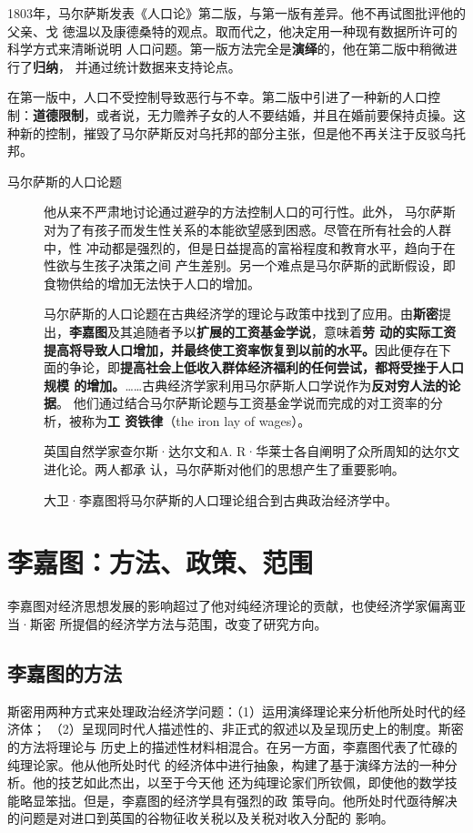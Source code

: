 1803年，马尔萨斯发表《人口论》第二版，与第一版有差异。他不再试图批评他的父亲、戈
徳温以及康德桑特的观点。取而代之，他决定用一种现有数据所许可的科学方式来清晰说明
人口问题。第一版方法完全是\textbf{演绎}的，他在第二版中稍微进行了\textbf{归纳}，
并通过统计数据来支持论点。

在第一版中，人口不受控制导致恶行与不幸。第二版中引进了一种新的人口控
制：\textbf{道德限制}，或者说，无力赡养子女的人不要结婚，并且在婚前要保持贞操。这
种新的控制，摧毁了马尔萨斯反对乌托邦的部分主张，但是他不再关注于反驳乌托邦。

\begin{description}
\item[马尔萨斯的人口论题] 他从来不严肃地讨论通过避孕的方法控制人口的可行性。此外，
  马尔萨斯对为了有孩子而发生性关系的本能欲望感到困惑。尽管在所有社会的人群中，性
  冲动都是强烈的，但是日益提高的富裕程度和教育水平，趋向于在性欲与生孩子决策之间
  产生差别。另一个难点是马尔萨斯的武断假设，即食物供给的增加无法快于人口的增加。

  马尔萨斯的人口论题在古典经济学的理论与政策中找到了应用。由\textbf{斯密}提
  出，\textbf{李嘉图}及其追随者予以\textbf{扩展的工资基金学说}，意味着\textbf{劳
    动的实际工资提高将导致人口增加，并最终使工资率恢复到以前的水平。}因此便存在下
  面的争论，即\textbf{提高社会上低收入群体经济福利的任何尝试，都将受挫于人口规模
    的增加。}……古典经济学家利用马尔萨斯人口学说作为\textbf{反对穷人法的论据}。
  他们通过结合马尔萨斯论题与工资基金学说而完成的对工资率的分析，被称为\textbf{工
    资铁律}（the iron lay of wages）。

  英国自然学家查尔斯·达尔文和A. R·华莱士各自阐明了众所周知的达尔文进化论。两人都承
  认，马尔萨斯对他们的思想产生了重要影响。

  大卫·李嘉图将马尔萨斯的人口理论组合到古典政治经济学中。
\end{description}

\section{李嘉图：方法、政策、范围}

李嘉图对经济思想发展的影响超过了他对纯经济理论的贡献，也使经济学家偏离亚当·斯密
所提倡的经济学方法与范围，改变了研究方向。

\subsection{李嘉图的方法}

斯密用两种方式来处理政治经济学问题：（1）运用演绎理论来分析他所处时代的经济体；
（2）呈现同时代人描述性的、非正式的叙述以及呈现历史上的制度。斯密的方法将理论与
历史上的描述性材料相混合。在另一方面，李嘉图代表了忙碌的纯理论家。他从他所处时代
的经济体中进行抽象，构建了基于演绎方法的一种分析。他的技艺如此杰出，以至于今天他
还为纯理论家们所钦佩，即使他的数学技能略显笨拙。但是，李嘉图的经济学具有强烈的政
策导向。他所处时代亟待解决的问题是对进口到英国的谷物征收关税以及关税对收入分配的
影响。

